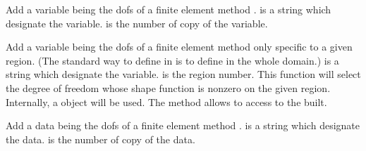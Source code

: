 \documentclass[a4paper,11pt,english]{sphinxmanual}
\begin{document}

\begin{fulllineitems}
\label{\detokenize{userdoc/model_object:_CPPv4N6getfem5model16add_fem_variableE4name2mf5niter}}%
\pysigstartmultiline
{}%
\pysigstopmultiline
Add a variable being the dofs of a finite element method .  is a
string which designate the variable.  is the number of copy of the
variable.

\end{fulllineitems}


\begin{fulllineitems}
\label{\detokenize{userdoc/model_object:_CPPv4N6getfem5model25add_filtered_fem_variableE4name2mf6region}}%
\pysigstartmultiline
{}%
\pysigstopmultiline
Add a variable being the dofs of a finite element method  only
specific to a given region.
(The standard way to define  in  is to define in the whole domain.)
 is a string which designate the variable.  is the region
number. This function will select the degree of freedom whose shape
function is non\sphinxhyphen{}zero on the given region. Internally, a 
object will be used. The method  allows to
access to the  built.

\end{fulllineitems}


\begin{fulllineitems}
\label{\detokenize{userdoc/model_object:_CPPv4N6getfem5model12add_fem_dataE4name2mf5niter}}%
\pysigstartmultiline
{}%
\pysigstopmultiline
Add a data being the dofs of a finite element method .  is a
string which designate the data.  is the number of copy of the data.

\end{fulllineitems}
\end{document}
